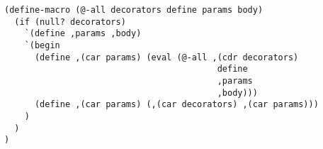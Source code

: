 \begin{blocksection}
\begin{solution}
\begin{lstlisting}
(define-macro (@-all decorators define params body)
  (if (null? decorators)
    `(define ,params ,body)
    `(begin 
      (define ,(car params) (eval (@-all ,(cdr decorators) 
                                          define 
                                          ,params 
                                          ,body)))
      (define ,(car params) (,(car decorators) ,(car params)))
    )
  )
)
\end{lstlisting}
\end{solution}
\end{blocksection}